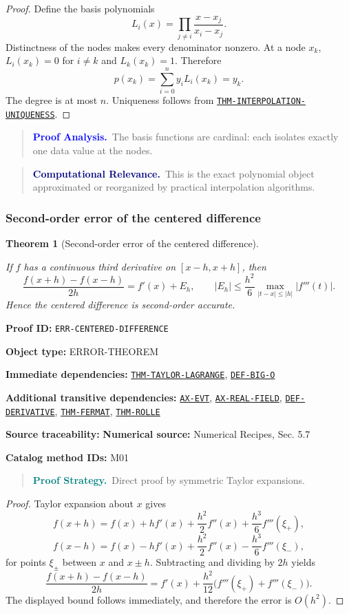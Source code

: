 \documentclass[10pt]{article}
\newcommand{\pidraw}[1]{\begingroup\urlstyle{tt}\nolinkurl{#1}\endgroup}
\newcommand{\pidref}[1]{\hyperref[prf:#1]{\pidraw{#1}}}
\newcommand{\pid}[1]{\pidref{#1}}
\newtheorem{theorem}{Theorem}[section]
\theoremstyle{definition}
\theoremstyle{remark}
\newenvironment{proofstrategy}
{\begin{quote}\small\noindent\textbf{\textcolor{teal}{Proof Strategy.}}\ }
{\end{quote}}
\newenvironment{proofanalysis}
{\begin{quote}\small\noindent\textbf{\textcolor{blue}{Proof Analysis.}}\ }
{\end{quote}}
\newenvironment{computationalrelevance}
{\begin{quote}\small\noindent\textbf{\textcolor{navy}{Computational Relevance.}}\ }
{\end{quote}}
\newcommand{\meta}[2]{\noindent\textbf{#1:} #2\par}
\begin{document}
\begin{proof}

Define the basis polynomials
\[
L_i(x)=
\prod_{j\ne i}\frac{x-x_j}{x_i-x_j}.
\]
Distinctness of the nodes makes every denominator nonzero. At a node $x_k$,
$L_i(x_k)=0$ for $i\ne k$ and $L_k(x_k)=1$. Therefore
\[
p(x_k)=\sum_{i=0}^n y_i L_i(x_k)=y_k.
\]
The degree is at most $n$. Uniqueness follows from
\pid{THM-INTERPOLATION-UNIQUENESS}.

\end{proof}

\begin{proofanalysis}The basis functions are cardinal: each isolates exactly one data value at the nodes.\end{proofanalysis}

\begin{computationalrelevance}This is the exact polynomial object approximated or reorganized by practical interpolation algorithms.\end{computationalrelevance}

\subsubsection{Second-order error of the centered difference}

\begin{theorem}[Second-order error of the centered difference]\label{prf:ERR-CENTERED-DIFFERENCE}

If $f$ has a continuous third derivative on $[x-h,x+h]$, then
\[
\frac{f(x+h)-f(x-h)}{2h}=f'(x)+E_h,
\qquad
|E_h|\le \frac{h^2}{6}\max_{|t-x|\le|h|}|f'''(t)|.
\]
Hence the centered difference is second-order accurate.

\end{theorem}

\meta{Proof ID}{\pidraw{ERR-CENTERED-DIFFERENCE}}
\meta{Object type}{ERROR-THEOREM}
\meta{Immediate dependencies}{\pidref{THM-TAYLOR-LAGRANGE}, \pidref{DEF-BIG-O}}
\meta{Additional transitive dependencies}{\pidref{AX-EVT}, \pidref{AX-REAL-FIELD}, \pidref{DEF-DERIVATIVE}, \pidref{THM-FERMAT}, \pidref{THM-ROLLE}}
\meta{Source traceability}{\textbf{Numerical source:} Numerical Recipes, Sec. 5.7}
\meta{Catalog method IDs}{M01}

\begin{proofstrategy}Direct proof by symmetric Taylor expansions.\end{proofstrategy}

\begin{proof}

Taylor expansion about $x$ gives
\[
f(x+h)=f(x)+hf'(x)+\frac{h^2}{2}f''(x)+\frac{h^3}{6}f'''(\xi_+),
\]
\[
f(x-h)=f(x)-hf'(x)+\frac{h^2}{2}f''(x)-\frac{h^3}{6}f'''(\xi_-),
\]
for points $\xi_\pm$ between $x$ and $x\pm h$. Subtracting and dividing by
$2h$ yields
\[
\frac{f(x+h)-f(x-h)}{2h}
=
f'(x)+\frac{h^2}{12}\bigl(f'''(\xi_+)+f'''(\xi_-)\bigr).
\]
The displayed bound follows immediately, and therefore the error is $O(h^2)$.

\end{proof}
\end{document}
